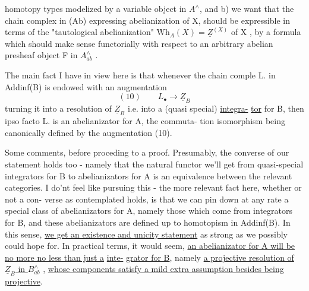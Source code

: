 
 homotopy types modelized by a variable object  in $A^\wedge$, and b) we want that
the chain complex in (Ab) expressing abelianization of X, should be
expressible in terms of the "tautological abelianization" $\mathrm{Wh}_A(X) = \underline{Z}^{(X)}$
of X ,  by a formula  which should make sense functorially with respect
to an arbitrary abelian presheaf   object F in $A^\wedge_{ab}$ .

The main fact I have in view here is that whenever the chain comple
L. in Addinf(B) is endowed with an augmentation
\[ (10) \qquad L_{\bullet} \longrightarrow \underline{Z}_B \]
turning it into a resolution of $\underline{Z}_B$ i.e. into a (quasi special) \uline{integra-}%
\uline{tor} for B, then ipso facto L. is an abelianizator for A, the commuta-%
tion isomorphism \hand{$\lambda$} being canonically defined by the augmentation (10).

Some comments, before proceding to a proof. Presumably, the
converse of our statement holds too - namely that the natural functor
we'll get from quasi-special integrators for B to abelianizators  for A
is an equivalence  between the relevant categories. I do'nt feel like
pursuing this -  the more relevant fact here, whether or not a con-%
verse as contemplated holds, is that we can pin down at any rate a
special class of  abelianizators for A, namely those which come from
 integrators for B, and these abelianizators are defined up to  homotopism
in Addinf(B). In this sense, \uline{we get an existence and unicity statement}
 as strong as we possibly could hope for. In practical terms, it would
seem, \uline{an abelianizator for A will be no more no less than just a}  \uline{inte-}%
\uline{grator for B}, namely \uline{a projective resolution of $\underline{Z}_B$ in $B^\wedge_{ab}$} , 
\uline{whose components satisfy a mild extra assumption besides being projective}.

